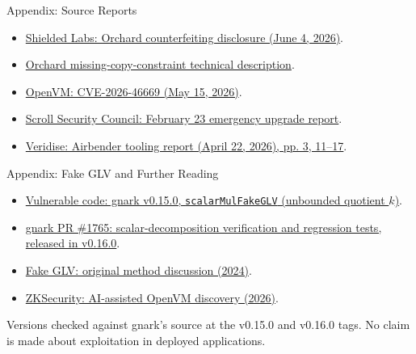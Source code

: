 \documentclass[aspectratio=169,11pt]{beamer}
\begin{document}
\appendix
\begin{frame}{Appendix: Source Reports}
\small\begin{itemize}
\item \href{https://shieldedlabs.net/the-orchard-counterfeiting-vulnerability/}{Shielded Labs: Orchard counterfeiting disclosure (June 4, 2026)}.
\item \href{https://nvd.nist.gov/vuln/detail/CVE-2026-54496}{Orchard missing-copy-constraint technical description}.
\item \href{https://github.com/openvm-org/openvm/security/advisories/GHSA-76mq-v757-53gr}{OpenVM: CVE-2026-46669 (May 15, 2026)}.
\item \href{https://forum.scroll.io/t/report-scroll-mainnet-emergency-upgrade-on-2026-02-23/1412}{Scroll Security Council: February 23 emergency upgrade report}.
\item \href{https://veridise.com/wp-content/uploads/2026/05/VAR_zksync_260216_picus_fuzzing-_Veridise_Security_Audit_AuditHub.pdf}{Veridise: Airbender tooling report (April 22, 2026), pp. 3, 11--17}.
\end{itemize}
\end{frame}

\begin{frame}{Appendix: Fake GLV and Further Reading}
\small\begin{itemize}
\item \href{https://github.com/Consensys-Incorporated/gnark/blob/v0.15.0/std/algebra/native/twistededwards/point.go\#L129-L182}{Vulnerable code: gnark v0.15.0, \texttt{scalarMulFakeGLV} (unbounded quotient $k$)}.
\item \href{https://github.com/Consensys-Incorporated/gnark/pull/1765}{gnark PR \#1765: scalar-decomposition verification and regression tests, released in v0.16.0}.
\item \href{https://ethresear.ch/t/fake-glv-you-dont-need-an-efficient-endomorphism-to-implement-glv-like-scalar-multiplication-in-snark-circuits/20394}{Fake GLV: original method discussion (2024)}.
\item \href{https://blog.zksecurity.xyz/posts/openvm-bugs/}{ZKSecurity: AI-assisted OpenVM discovery (2026)}.
\end{itemize}
\vspace{4mm}Versions checked against gnark's source at the v0.15.0 and v0.16.0 tags. No claim is made about exploitation in deployed applications.
\end{frame}
\end{document}
